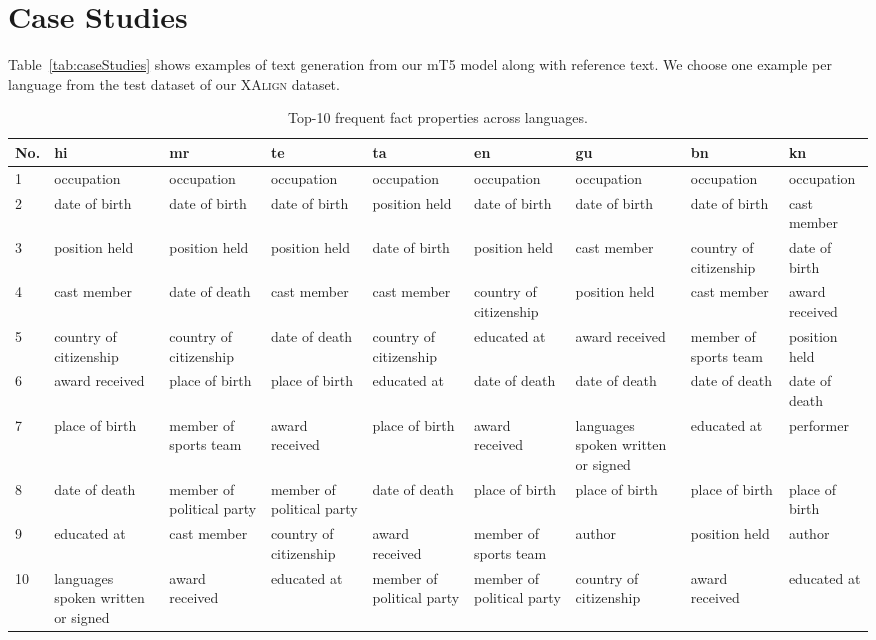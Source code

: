 \documentclass[11pt]{article}
\begin{document}
\section{Case Studies}
Table~\ref{tab:caseStudies} shows examples of text generation from our mT5 model along with reference text. We choose one example per language from the test dataset of our \textsc{XAlign} dataset.



\begin{table*}[!t]
    \centering
    \scriptsize
    \begin{tabular}{|l|p{0.65in}|p{0.65in}|p{0.65in}|p{0.65in}|p{0.65in}|p{0.65in}|p{0.65in}|p{0.65in}|}
    \hline
    No.&hi&mr&te&ta&en&gu&bn&kn\\
    \hline
    \hline
    1&occupation&occupation&occupation&occupation&occupation&occupation&occupation&occupation\\
    \hline
    2&date of birth&date of birth&date of birth&position held&date of birth&date of birth&date of birth&cast member\\
    \hline
    3&position held&position held&position held&date of birth&position held&cast member&country of citizenship&date of birth\\
    \hline
    4&cast member&date of death&cast member&cast member&country of citizenship&position held&cast member&award received\\
    \hline
    5&country of citizenship&country of citizenship&date of death&country of citizenship&educated at&award received&member of sports team&position held\\
    \hline
    6&award received&place of birth&place of birth&educated at&date of death&date of death&date of death&date of death\\
    \hline
    7&place of birth&member of sports team&award received&place of birth&award received&languages spoken written or signed&educated at&performer\\
    \hline
    8&date of death&member of political party&member of political party&date of death&place of birth&place of birth&place of birth&place of birth\\
    \hline
    9&educated at&cast member&country of citizenship&award received&member of sports team&author&position held&author\\
    \hline
    10&languages spoken written or signed&award received&educated at&member of political party&member of political party&country of citizenship&award received&educated at\\
    \hline
    \end{tabular}
    \caption{Top-10 frequent fact properties across languages.}
    \label{tab:topkpredicates}
\end{table*}
\end{document}
